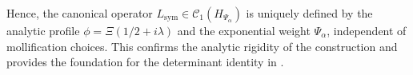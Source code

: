 \begin{lemma}
\noindent
Hence, the canonical operator \( L_{\mathrm{sym}} \in \mathcal{C}_1(H_{\Psi_\alpha}) \) is uniquely defined by the analytic profile \( \phi = \Xi(1/2 + i\lambda) \) and the exponential weight \( \Psi_\alpha \), independent of mollification choices. This confirms the analytic rigidity of the construction and provides the foundation for the determinant identity in .
\end{lemma}
% 